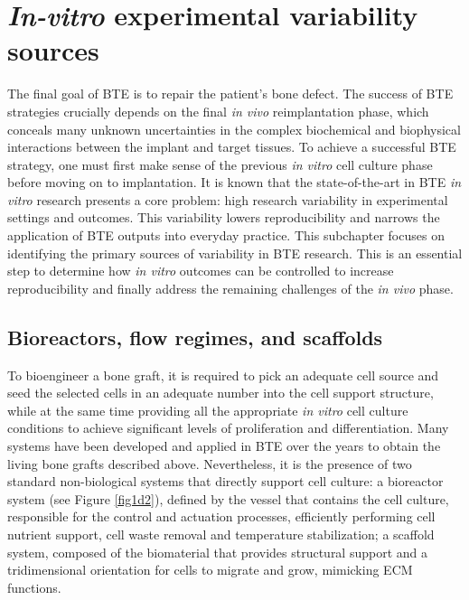 \section{\textit{In-vitro} experimental variability sources}

The final goal of \ac{BTE} is to repair the patient's bone defect. The success of \ac{BTE} strategies crucially depends on the final \textit{in vivo} reimplantation phase, which conceals many unknown uncertainties in the complex biochemical and biophysical interactions between the implant and target tissues. To achieve a successful \ac{BTE} strategy, one must first make sense of the previous \textit{in vitro} cell culture phase before moving on to implantation. It is known that the state-of-the-art in \ac{BTE} \textit{in vitro} research presents a core problem: high research variability in experimental settings and outcomes. This variability lowers reproducibility and narrows the application of \ac{BTE} outputs into everyday practice. This subchapter focuses on identifying the primary sources of variability in \ac{BTE} research. This is an essential step to determine how \textit{in vitro} outcomes can be controlled to increase reproducibility and finally address the remaining challenges of the \textit{in vivo} phase.

\subsection{Bioreactors, flow regimes, and scaffolds}

To bioengineer a bone graft, it is required to pick an adequate cell source and seed the selected cells in an adequate number into the cell support structure, while at the same time providing all the appropriate \textit{in vitro} cell culture conditions to achieve significant levels of proliferation and differentiation. Many systems have been developed and applied in \ac{BTE} over the years to obtain the living bone grafts described above. Nevertheless, it is the presence of two standard non-biological systems that directly support cell culture: a bioreactor system (see Figure \ref{fig1d2}), defined by the vessel that contains the cell culture, responsible for the control and actuation processes, efficiently performing cell nutrient support, cell waste removal and temperature stabilization; a scaffold system, composed of the biomaterial that provides structural support and a tridimensional orientation for cells to migrate and grow, mimicking \ac{ECM} functions. 

